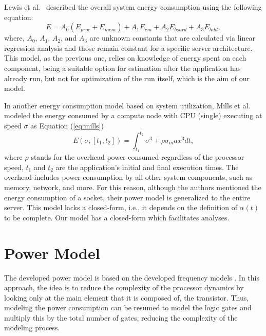 Lewis et al.~\cite{Lewis2008Run-timeSystems} described the overall system energy consumption using the following equation:
\begin{equation}
E = A_0(E_{proc} + E_{mem}) + A_1E_{em} + A_2E_{board} + A_3E_{hdd},
\label{eq:lewvis}
\end{equation}
where, $A_0$, $A_1$, $A_2$, and $A_3$ are unknown constants that are calculated via linear regression analysis and those remain constant for a specific server architecture. This model, as the previous one, relies on knowledge of energy spent on each component, being  a suitable option for estimation after the application has already run, but not for optimization of the run itself, which is the aim of our model.

In another energy consumption model  based on system utilization, Mills et al. \cite{Mills2014EnergySystems} modeled the energy consumed by a compute node with CPU (single) executing at speed $\sigma$ as Equation (\ref{eq:mills})%
\begin{equation}
E(\sigma,[t_1,t_2]) = \int_{t_1}^{t_2} \sigma^3 + \rho \sigma_max^3 dt,
\label{eq:mills}
\end{equation}
where $\rho$ stands for the overhead power consumed regardless of the processor speed, $t_1$ and $t_2$ are the application's initial and final execution times. The overhead includes power consumption by all other system components, such as memory, network, and more. For this reason, although the authors mentioned the energy consumption of a socket, their power model is generalized to the entire server. This model lacks a closed-form, i.e., it depends on the definition of $\alpha(t)$ to be complete. Our model has a closed-form which facilitates analyses.

\section{Power Model} \label{sec:power_model}

The developed power model is based on the developed frequency models \cite{Rauber2014EnergyScaling, Goel2016AProcessors, Du2017ModelingSystems, Gonzalez1997SupplyCMOS}. In this approach, the idea is to reduce the complexity of the processor dynamics by looking only at the main element that it is composed of, the transistor. Thus, modeling the power consumption can be resumed to model the logic gates and multiply this by the total number of gates, reducing the complexity of the modeling process.

